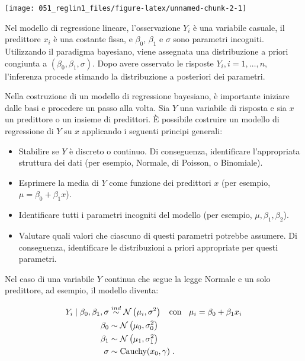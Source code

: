 \documentclass[
  10pt,
  italian,
  a4paper,
  extrafontsizes,onecolumn,openright
  ]{memoir}
\providecommand{\tightlist}{%
  \setlength{\itemsep}{0pt}\setlength{\parskip}{0pt}}
\begin{document}
\begin{center}\texttt{[image: 051\_reglin1\_files/figure-latex/unnamed-chunk-2-1]} \end{center}

Nel modello di regressione lineare, l'osservazione \(Y_i\) è una variabile casuale, il predittore \(x_i\) è una costante fissa, e \(\beta_0\), \(\beta_1\) e \(\sigma\) sono parametri incogniti. Utilizzando il paradigma bayesiano, viene assegnata una distribuzione a priori congiunta a \((\beta_0, \beta_1, \sigma)\). Dopo avere osservato le risposte \(Y_i, i = 1, \dots, n\), l'inferenza procede stimando la distribuzione a posteriori dei parametri.

Nella costruzione di un modello di regressione bayesiano, è importante iniziare dalle basi e procedere un passo alla volta. Sia \(Y\) una variabile di risposta e
sia \(x\) un predittore o un insieme di predittori. È possibile costruire un modello di regressione di \(Y\) su \(x\) applicando i seguenti principi generali:

\begin{itemize}
\tightlist
\item
  Stabilire se \(Y\) è discreto o continuo. Di conseguenza, identificare l'appropriata struttura dei dati (per esempio, Normale, di Poisson, o Binomiale).
\item
  Esprimere la media di \(Y\) come funzione dei predittori \(x\) (per esempio, \(\mu = \beta_0 + \beta_1 x\)).
\item
  Identificare tutti i parametri incogniti del modello (per esempio, \(\mu, \beta_1, \beta_2\)).
\item
  Valutare quali valori che ciascuno di questi parametri potrebbe assumere. Di conseguenza, identificare le distribuzioni a priori appropriate per questi parametri.
\end{itemize}

Nel caso di una variabile \(Y\) continua che segue la legge Normale e un solo predittore, ad esempio, il modello diventa:

\begin{align} 
Y_i \mid \beta_0, \beta_1, \sigma  &\stackrel{ind}{\sim} \mathcal{N}\left(\mu_i, \sigma^2\right) \;\; \text{ con } \;\; \mu_i = \beta_0 + \beta_1 x_i \notag\\
\beta_0  &\sim \mathcal{N}\left(\mu_0, \sigma_0^2 \right)  \notag\\
\beta_1  & \sim \mathcal{N}\left(\mu_1, \sigma_1^2 \right) \notag\\
\sigma & \sim \text{Cauchy}(x_0, \gamma) \; .\notag
\end{align}
\end{document}
